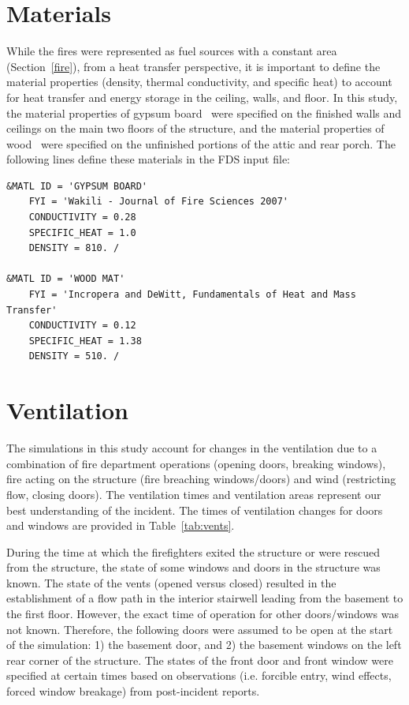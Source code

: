 \documentclass[12pt,oneside]{book}
\begin{document}
\section{Materials}
\label{matl}
While the fires were represented as fuel sources with a constant area (Section~\ref{fire}), from a heat transfer perspective, it is important to define the material properties (density, thermal conductivity, and specific heat) to account for heat transfer and energy storage in the ceiling, walls, and floor. In this study, the material properties of gypsum board~\cite{WAKILI2007} were specified on the finished walls and ceilings on the main two floors of the structure, and the material properties of wood~\cite{Incropera:1} were specified on the unfinished portions of the attic and rear porch. The following lines define these materials in the FDS input file:

\begin{lstlisting}
&MATL ID = 'GYPSUM BOARD'
    FYI = 'Wakili - Journal of Fire Sciences 2007' 
    CONDUCTIVITY = 0.28
    SPECIFIC_HEAT = 1.0
    DENSITY = 810. /

&MATL ID = 'WOOD MAT'
    FYI = 'Incropera and DeWitt, Fundamentals of Heat and Mass Transfer'
    CONDUCTIVITY = 0.12
    SPECIFIC_HEAT = 1.38
    DENSITY = 510. / 
\end{lstlisting}

\section{Ventilation}
\label{Vents}
The simulations in this study account for changes in the ventilation due to a combination of fire department operations (opening doors, breaking windows), fire acting on the structure (fire breaching windows/doors) and wind (restricting flow, closing doors). The ventilation times and ventilation areas represent our best understanding of the incident. The times of ventilation changes for doors and windows are provided in Table~\ref{tab:vents}.

During the time at which the firefighters exited the structure or were rescued from the structure, the state of some windows and doors in the structure was known. The state of the vents (opened versus closed) resulted in the establishment of a flow path in the interior stairwell leading from the basement to the first floor. However, the exact time of operation for other doors/windows was not known. Therefore, the following doors were assumed to be open at the start of the simulation: 1) the basement door, and 2) the basement windows on the left rear corner of the structure. The states of the front door and front window were specified at certain times based on observations (i.e. forcible entry, wind effects, forced window breakage) from post-incident reports.
\end{document}
